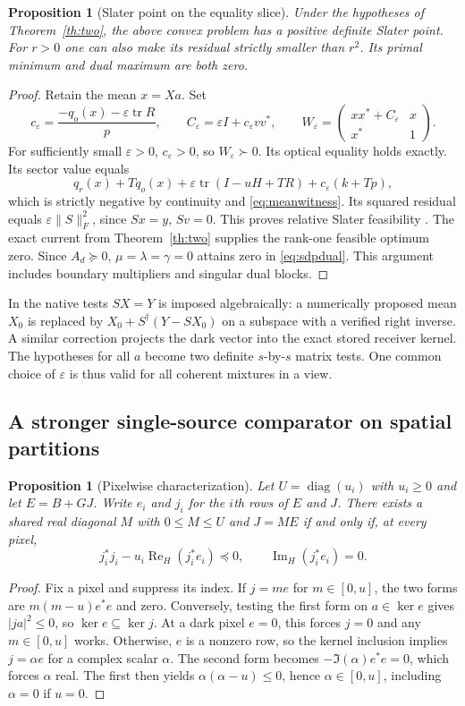 \documentclass[anonymous,12pt]{iopjournal}
\newtheorem{proposition}[theorem]{Proposition}
\theoremstyle{remark}\newtheorem{remark}[theorem]{Remark}
\newcommand{\Herm}{\operatorname{Re}_{\!H}}\newcommand{\Imag}{\operatorname{Im}_{\!H}}
\newcommand{\tr}{\operatorname{tr}}\newcommand{\diag}{\operatorname{diag}}
\newcommand{\eps}{\varepsilon}\newcommand{\dd}{\mathrm{d}}
\numberwithin{equation}{section}
\begin{document}
\begin{proposition}[Slater point on the equality slice]\label{prop:slater}
Under the hypotheses of Theorem~\ref{th:two}, the above convex problem has a positive definite Slater point. For $r>0$ one can also make its residual strictly smaller than $r^2$. Its primal minimum and dual maximum are both zero.
\end{proposition}
\begin{proof}
Retain the mean $x=Xa$. Set
\[
 c_\eps=\frac{-q_o(x)-\eps\tr R}{p},\qquad
 C_\eps=\eps I+c_\eps vv^*,\qquad
 W_\eps=\begin{pmatrix}xx^*+C_\eps&x\\x^*&1\end{pmatrix}.
\]
For sufficiently small $\eps>0$, $c_\eps>0$, so $W_\eps\succ0$. Its optical equality holds exactly. Its sector value equals
\[
 q_r(x)+Tq_o(x)+\eps\tr(I-uH+TR)+c_\eps(k+Tp),
\]
which is strictly negative by continuity and \eqref{eq:meanwitness}. Its squared residual equals $\eps\|S\|_F^2$, since $Sx=y$, $Sv=0$. This proves relative Slater feasibility \cite{boyd}. The exact current from Theorem~\ref{th:two} supplies the rank-one feasible optimum zero. Since $A_d\succeq0$, $\mu=\lambda=\gamma=0$ attains zero in \eqref{eq:sdpdual}. This argument includes boundary multipliers and singular dual blocks.
\end{proof}
In the native tests $SX=Y$ is imposed algebraically: a numerically proposed mean $X_0$ is replaced by $X_0+S^\dagger(Y-SX_0)$ on a subspace with a verified right inverse. A similar correction projects the dark vector into the exact stored receiver kernel. The hypotheses for all $a$ become two definite $s$-by-$s$ matrix tests. One common choice of $\eps$ is thus valid for all coherent mixtures in a view.

\subsection{A stronger single-source comparator on spatial partitions}
\begin{proposition}[Pixelwise characterization]\label{prop:pixel}
Let $U=\diag(u_i)$ with $u_i\ge0$ and let $E=B+GJ$. Write $e_i$ and $j_i$ for the $i$th rows of $E$ and $J$. There exists a shared real diagonal $M$ with $0\le M\le U$ and $J=ME$ if and only if, at every pixel,
\begin{equation}
 j_i^*j_i-u_i\Herm(j_i^*e_i)\preceq0,
 \qquad \Imag(j_i^*e_i)=0. \label{eq:pixel}
\end{equation}
\end{proposition}
\begin{proof}
Fix a pixel and suppress its index. If $j=me$ for $m\in[0,u]$, the two forms are $m(m-u)e^*e$ and zero. Conversely, testing the first form on $a\in\ker e$ gives $|ja|^2\le0$, so $\ker e\subseteq\ker j$. At a dark pixel $e=0$, this forces $j=0$ and any $m\in[0,u]$ works. Otherwise, $e$ is a nonzero row, so the kernel inclusion implies $j=\alpha e$ for a complex scalar $\alpha$. The second form becomes $-\Im(\alpha)e^*e=0$, which forces $\alpha$ real. The first then yields $\alpha(\alpha-u)\le0$, hence $\alpha\in[0,u]$, including $\alpha=0$ if $u=0$.
\end{proof}
\end{document}
